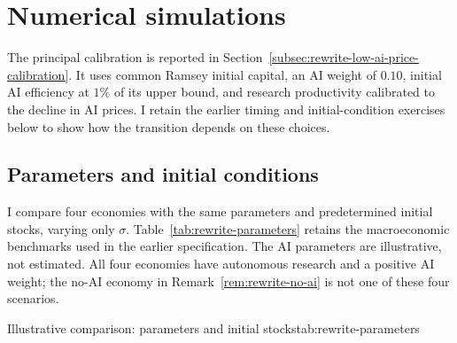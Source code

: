 \section{Numerical simulations}
\label{sec:rewrite-quantitative}


The principal calibration is reported in
Section~\ref{subsec:rewrite-low-ai-price-calibration}. It uses common Ramsey
initial capital, an AI weight of $0.10$, initial AI efficiency at $1\%$ of
its upper bound, and research productivity calibrated to the decline in AI
prices. I retain the earlier timing and initial-condition exercises below
to show how the transition depends on these choices.

\subsection{Parameters and initial conditions}
\label{subsec:rewrite-calibration}

I compare four economies with the same parameters and predetermined initial
stocks, varying only $\sigma$. Table~\ref{tab:rewrite-parameters} retains the
macroeconomic benchmarks used in the earlier specification. The AI parameters
are illustrative, not estimated. All four economies have autonomous research
and a positive AI weight; the no-AI economy in Remark~\ref{rem:rewrite-no-ai}
is not one of these four scenarios.

\begin{rewriteParameterTable}{Illustrative comparison: parameters and initial stocks}{tab:rewrite-parameters}
\rewriteMainParameterRows
\end{rewriteParameterTable}

